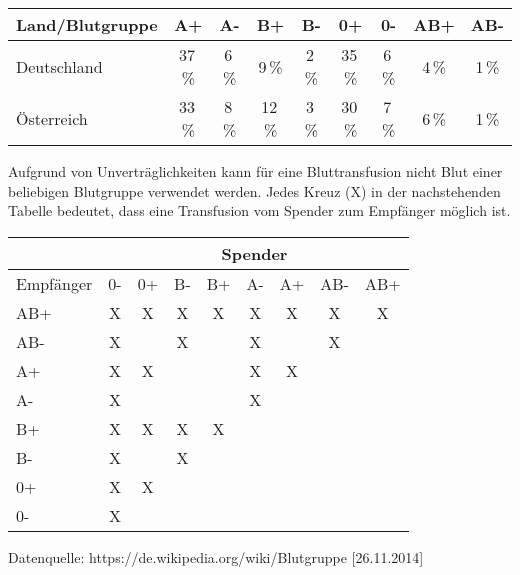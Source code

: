 \begin{langesbeispiel}
\begin{center}
\begin{tabular}{|l|c|c|c|c|c|c|c|c|}\hline
Land/Blutgruppe&A+&A-&B+&B-&0+&0-&AB+&AB-\\ \hline
Deutschland&37\,\%&6\,\%&9\,\%&2\,\%&35\,\%&6\,\%&4\,\%&1\,\%\\ \hline
Österreich&33\,\%&8\,\%&12\,\%&3\,\%&30\,\%&7\,\%&6\,\%&1\,\%\\ \hline
\end{tabular}
\end{center}

Aufgrund von Unverträglichkeiten kann für eine Bluttransfusion nicht Blut einer beliebigen Blutgruppe verwendet werden. Jedes Kreuz (X) in der nachstehenden Tabelle bedeutet, dass eine Transfusion vom Spender zum Empfänger möglich ist.

\begin{center}
	\begin{tabular}{l|c|c|c|c|c|c|c|c|}\cline{2-9}
	&\multicolumn{8}{|c|}{\cellcolor[gray]{0.9}Spender}\\ \hline
	\multicolumn{1}{|l|}{\cellcolor[gray]{0.7}Empfänger}&\cellcolor[gray]{0.9}0-&\cellcolor[gray]{0.9}0+&\cellcolor[gray]{0.9}B-&\cellcolor[gray]{0.9}B+&\cellcolor[gray]{0.9}A-&\cellcolor[gray]{0.9}A+&\cellcolor[gray]{0.9}AB-&\cellcolor[gray]{0.9}AB+\\ \hline
	\multicolumn{1}{|l|}{\cellcolor[gray]{0.7}AB+}&X&X&X&X&X&X&X&X\\ \hline
	\multicolumn{1}{|l|}{\cellcolor[gray]{0.7}AB-}&X&&X&&X&&X&\\ \hline
	\multicolumn{1}{|l|}{\cellcolor[gray]{0.7}A+}&X&X&&&X&X&&\\ \hline
	\multicolumn{1}{|l|}{\cellcolor[gray]{0.7}A-}&X&&&&X&&&\\ \hline
	\multicolumn{1}{|l|}{\cellcolor[gray]{0.7}B+}&X&X&X&X&&&&\\ \hline
	\multicolumn{1}{|l|}{\cellcolor[gray]{0.7}B-}&X&&X&&&&&\\ \hline
	\multicolumn{1}{|l|}{\cellcolor[gray]{0.7}0+}&X&X&&&&&&\\ \hline
	\multicolumn{1}{|l|}{\cellcolor[gray]{0.7}0-}&X&&&&&&&\\ \hline
	\end{tabular}
\end{center}
\begin{scriptsize}Datenquelle: https://de.wikipedia.org/wiki/Blutgruppe [26.11.2014]\end{scriptsize}


\end{langesbeispiel}
